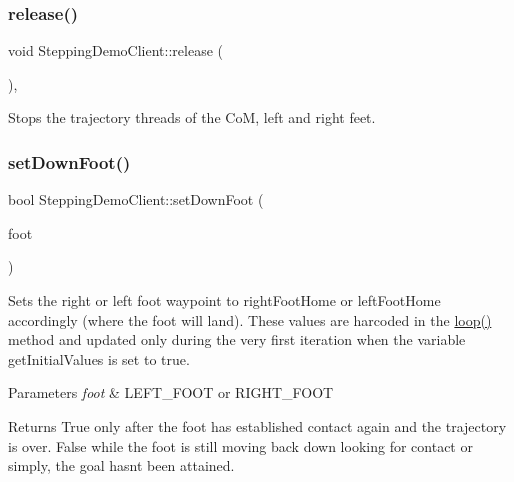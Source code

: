 \subsubsection{\texorpdfstring{release()}{release()}}
{\footnotesize\ttfamily void Stepping\+Demo\+Client\+::release (\begin{DoxyParamCaption}{ }\end{DoxyParamCaption})\hspace{0.3cm}{\ttfamily [protected]}, {\ttfamily [virtual]}}

Stops the trajectory threads of the CoM, left and right feet. \hypertarget{classSteppingDemoClient_a930123dad5658ea8a3bb5f23cb4cb369}{}\label{classSteppingDemoClient_a930123dad5658ea8a3bb5f23cb4cb369} 
\subsubsection{\texorpdfstring{set\+Down\+Foot()}{setDownFoot()}}
{\footnotesize\ttfamily bool Stepping\+Demo\+Client\+::set\+Down\+Foot (\begin{DoxyParamCaption}\item[{\hyperlink{SteppingDemoClient_8h_ab0673d7f17cdd57b8fa124abb330287f}{F\+O\+O\+T\+\_\+\+C\+O\+N\+T\+A\+C\+TS}}]{foot }\end{DoxyParamCaption})\hspace{0.3cm}{\ttfamily [private]}}

Sets the right or left foot waypoint to right\+Foot\+Home or left\+Foot\+Home accordingly (where the foot will land). These values are harcoded in the \hyperlink{classSteppingDemoClient_a37dba4764b5849cf33c395cd0d4b0eb5}{loop()} method and updated only during the very first iteration when the variable get\+Initial\+Values is set to true.


\begin{DoxyParams}{Parameters}
{\em foot} & L\+E\+F\+T\+\_\+\+F\+O\+OT or R\+I\+G\+H\+T\+\_\+\+F\+O\+OT\\
\hline
\end{DoxyParams}
\begin{DoxyReturn}{Returns}
True only after the foot has established contact again and the trajectory is over. False while the foot is still moving back down looking for contact or simply, the goal hasn\textquotesingle{}t been attained. 
\end{DoxyReturn}
\hypertarget{classSteppingDemoClient_a256284578a6b9818a8f726451d2fb2c4}{}\label{classSteppingDemoClient_a256284578a6b9818a8f726451d2fb2c4} 
